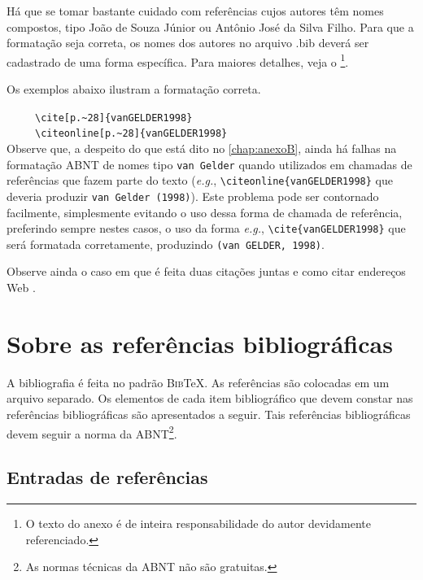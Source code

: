 \begin{apendicesenv}
Há que se tomar bastante cuidado com referências cujos autores têm nomes compostos, tipo João de Souza Júnior ou Antônio José da Silva Filho. Para que a formatação seja correta, os nomes dos autores no arquivo {\ttfamily .bib} deverá ser cadastrado de uma forma específica. Para maiores detalhes, veja o  \footnote{O texto do anexo é de inteira responsabilidade do autor devidamente referenciado.}.

Os exemplos abaixo ilustram a formatação correta.

\cite[p.~28]{vanGELDER1998} \ \ \ \ \  \verb|\cite[p.~28]{vanGELDER1998}|\\
 \ \ \ \ \  \verb|\citeonline[p.~28]{vanGELDER1998}|\\

Observe que, a despeito do que está dito no \autoref{chap:anexoB}, ainda há falhas na formatação ABNT de nomes tipo \verb|van Gelder| quando utilizados em chamadas de referências que fazem parte do texto (\textit{e.g.}, \verb|\citeonline{vanGELDER1998}| que deveria produzir \verb|van Gelder (1998)|). Este problema pode ser contornado facilmente, simplesmente evitando o uso dessa forma de chamada de referência, preferindo sempre nestes casos, o uso da forma \textit{e.g.}, \verb|\cite{vanGELDER1998}| que será formatada corretamente, produzindo \verb|(van GELDER, 1998)|.

Observe ainda o caso em que é feita duas citações juntas \cite{Santos2003, Neubert2001} e como citar endereços Web \cite{IRL2014}.


\chapter{Sobre as referências bibliográficas}
\label{chap:apSobreRefer}

A bibliografia é feita no padrão \textsc{Bib}\TeX{}. As referências são colocadas em um arquivo separado. Os elementos de cada item bibliográfico que devem constar nas referências bibliográficas são apresentados a seguir. Tais referências bibliográficas devem seguir a norma  da ABNT\footnote{As normas técnicas da ABNT não são gratuitas.}.

\section{Entradas de referências}
\label{sec:entradasRefs}


\end{apendicesenv}
